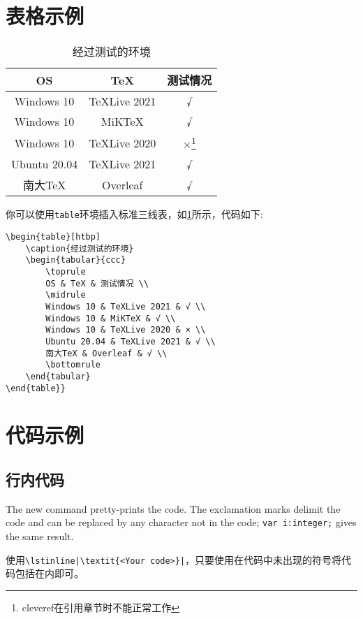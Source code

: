 \section{表格示例}
\begin{table}[htbp]
    \caption{经过测试的环境}
    \label{tab:testtab}
    \begin{tabular}{ccc}
        \toprule
        OS & TeX & 测试情况 \\
        \midrule
        Windows 10 & TeXLive 2021 & √ \\
        Windows 10 & MiKTeX & √ \\
        Windows 10 & TeXLive 2020 & ×\footnote{cleveref在引用章节时不能正常工作}  \\
        Ubuntu 20.04 & TeXLive 2021 & √ \\
        南大TeX & Overleaf & √ \\
        \bottomrule
    \end{tabular}
\end{table}
你可以使用\lstinline|table|环境插入标准三线表，如\cref{tab:testtab}所示，代码如下:
\begin{lstlisting}[style=LaTeX]
\begin{table}[htbp]
    \caption{经过测试的环境}
    \begin{tabular}{ccc}
        \toprule
        OS & TeX & 测试情况 \\
        \midrule
        Windows 10 & TeXLive 2021 & √ \\
        Windows 10 & MiKTeX & √ \\
        Windows 10 & TeXLive 2020 & × \\
        Ubuntu 20.04 & TeXLive 2021 & √ \\
        南大TeX & Overleaf & √ \\
        \bottomrule
    \end{tabular}
\end{table}}
\end{lstlisting}



\section{代码示例}


\subsection{行内代码}
The new command pretty-prints the code. The exclamation marks delimit
the code and can be replaced by any character not in the code;
\lstinline$var i:integer;$ gives the same result.

使用\lstinline!\lstinline|\textit{<Your code>}|!，只要使用在代码中未出现的符号将代码包括在内即可。
